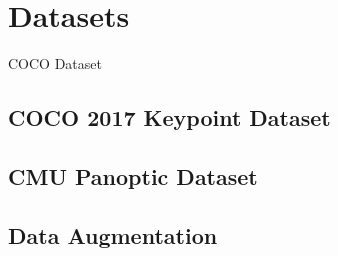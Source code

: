 \chapter{Datasets}\label{chapter:dataset}
COCO Dataset
\section{COCO 2017 Keypoint Dataset}
\section{CMU Panoptic Dataset}
\section{Data Augmentation}